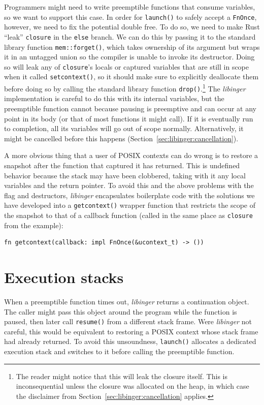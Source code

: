 Programmers might need to write preemptible functions that consume variables, so we
want to support this case.  In order for \texttt{launch()} to safely accept a
\texttt{FnOnce}, however, we need to fix the potential double free.  To do so, we
need to make Rust ``leak'' \texttt{closure} in the \texttt{else} branch.  We can do
this by passing it to the standard library function \texttt{mem::forget()}, which
takes ownership of its argument but wraps it in an untagged union so the compiler is
unable to invoke its destructor.  Doing so will leak any of \texttt{closure}'s locals
or captured variables that are still in scope when it called \texttt{setcontext()},
so it should make sure to explicitly deallocate them before doing so by calling the
standard library function \texttt{drop()}.\footnote{The reader might notice that this
will leak the closure itself.  This is inconsequential unless the closure was
allocated on the heap, in which case the disclaimer from
Section~\ref{sec:libinger:cancellation} applies.}  The \textit{libinger}
implementation is careful to do this with its internal variables, but the preemptible
function cannot because pausing is preemptive and can occur at any point in its body
(or that of most functions it might call).  If it is eventually run to completion,
all its variables will go out of scope normally.  Alternatively, it might be
cancelled before this happens (Section~\ref{sec:libinger:cancellation}).

A more obvious thing that a user of POSIX contexts can do wrong is to restore a
snapshot after the function that captured it has returned.  This is undefined
behavior because the stack may have been clobbered, taking with it any local
variables and the return pointer.  To avoid this and the above problems with the flag
and destructors, \textit{libinger} encapsulates boilerplate code with the solutions
we have developed into a \texttt{getcontext()} wrapper function that restricts the
scope of the snapshot to that of a callback function (called in the same place as
\texttt{closure} from the example):
\begin{lstlisting}[morekeywords={fn,impl,FnOnce}]
  fn getcontext(callback: impl FnOnce(&ucontext_t) -> ())
\end{lstlisting}


\section{Execution stacks}
\label{sec:libinger:stacks}

When a preemptible function times out, \textit{libinger} returns a continuation
object.  The caller might pass this object around the program while the function is
paused, then later call \texttt{resume()} from a different stack frame.  Were
\textit{libinger} not careful, this would be equivalent to restoring a POSIX context
whose stack frame had already returned.  To avoid this unsoundness, \texttt{launch()}
allocates a dedicated execution stack and switches to it before calling the
preemptible function.

